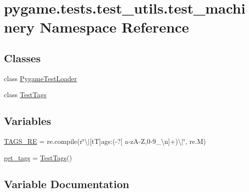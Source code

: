 \hypertarget{namespacepygame_1_1tests_1_1test__utils_1_1test__machinery}{}\section{pygame.\+tests.\+test\+\_\+utils.\+test\+\_\+machinery Namespace Reference}
\label{namespacepygame_1_1tests_1_1test__utils_1_1test__machinery}
\subsection*{Classes}
\begin{DoxyCompactItemize}
\item 
class \hyperlink{classpygame_1_1tests_1_1test__utils_1_1test__machinery_1_1_pygame_test_loader}{Pygame\+Test\+Loader}
\item 
class \hyperlink{classpygame_1_1tests_1_1test__utils_1_1test__machinery_1_1_test_tags}{Test\+Tags}
\end{DoxyCompactItemize}
\subsection*{Variables}
\begin{DoxyCompactItemize}
\item 
\hyperlink{namespacepygame_1_1tests_1_1test__utils_1_1test__machinery_a8561e30fe89b1412d346b265a718b13d}{T\+A\+G\+S\+\_\+\+RE} = re.\+compile(r\char`\"{}\textbackslash{}$\vert$\mbox{[}tT\mbox{]}ags\+:(-\/?\mbox{[} a-\/zA-\/Z,0-\/9\+\_\+\textbackslash{}n\mbox{]}+)\textbackslash{}$\vert$\char`\"{}, re.\+M)
\item 
\hyperlink{namespacepygame_1_1tests_1_1test__utils_1_1test__machinery_a68a0f1c9dd3e564dfae558bfcca89e8f}{get\+\_\+tags} = \hyperlink{classpygame_1_1tests_1_1test__utils_1_1test__machinery_1_1_test_tags}{Test\+Tags}()
\end{DoxyCompactItemize}


\subsection{Variable Documentation}
\mbox{\label{namespacepygame_1_1tests_1_1test__utils_1_1test__machinery_a68a0f1c9dd3e564dfae558bfcca89e8f}} 
